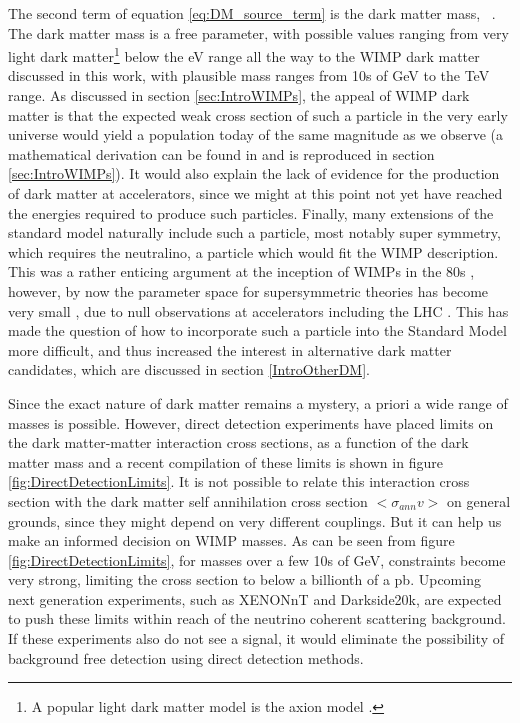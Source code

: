 The second term of equation \ref{eq:DM_source_term} is the dark matter mass, \dmm\ . The dark matter mass is a free parameter, with possible values ranging from very light dark matter\footnote{A popular light dark matter model is the axion model \cite{}.} below the eV range all the way to the WIMP dark matter discussed in this work, with plausible mass ranges from 10s of GeV to the TeV range. As discussed in section \ref{sec:IntroWIMPs}, the appeal of WIMP dark matter is that the expected weak cross section of such a particle in the very early universe would yield a population today of the same magnitude as we observe (a mathematical derivation can be found in \cite{dark matter production in the early universe} and is reproduced in section \ref{sec:IntroWIMPs}). It would also explain the lack of evidence for the production of dark matter at accelerators, since we might at this point not yet have reached the energies required to produce such particles. Finally, many extensions of the standard model naturally include such a particle, most notably super symmetry, which requires the neutralino, a particle which would fit the WIMP description\cite{}. This was a rather enticing argument at the inception of WIMPs in the 80s \cite{}, however, by now the parameter space for supersymmetric theories has become very small \cite{}, due to null observations at accelerators including the LHC \cite{}. This has made the question of how to incorporate such a particle into the Standard Model more difficult, and thus increased the interest in alternative dark matter candidates, which are discussed in section \ref{IntroOtherDM}.           


Since the exact nature of dark matter remains a mystery, a priori a wide range of masses is possible. However, direct detection experiments have placed limits on the dark matter-matter interaction cross sections, as a function of the dark matter mass \cite{} and a recent compilation of these limits is shown in figure \ref{fig:DirectDetectionLimits}. It is not possible to relate this interaction cross section with the dark matter self annihilation cross section $<\sigma_{ann} v>$ on general grounds, since they might depend on very different couplings. But it can help us make an informed decision on WIMP masses. As can be seen from figure \ref{fig:DirectDetectionLimits}, for masses over a few 10s of GeV, constraints become very strong, limiting the cross section to below a billionth of a pb. Upcoming next generation experiments, such as XENONnT\cite{} and Darkside20k\cite{}, are expected to push these limits within reach of the neutrino coherent scattering background. If these experiments also do not see a signal, it would eliminate the possibility of background free detection using direct detection methods. 

